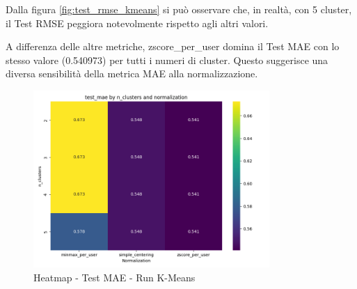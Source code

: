 Dalla figura \ref{fig:test_rmse_kmeans} si può osservare che, in realtà, con 5 cluster, il Test RMSE peggiora notevolmente rispetto agli altri valori.


\begin{table}[H]
  \centering
  \caption{Top 5 Configurazioni per Test MAE - Run K-Means}
\end{table}

A differenza delle altre metriche, zscore\_per\_user domina il Test MAE con lo stesso valore (0.540973) per tutti i numeri di cluster. Questo suggerisce una diversa sensibilità della metrica MAE alla normalizzazione.

\begin{figure}[H]
  \centering
  \includegraphics[width=0.8\textwidth]{../output/run_kmeans/images/test/mae/heatmap_test_mae.png}
  \caption{Heatmap - Test MAE - Run K-Means}
  \label{fig:test_mae_kmeans}
\end{figure}

